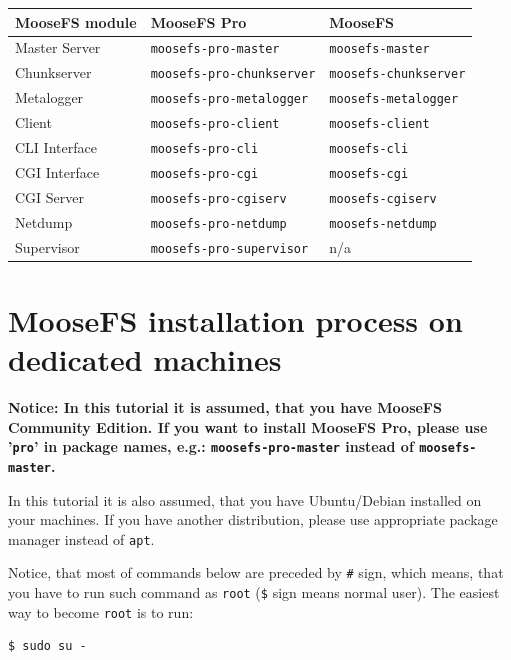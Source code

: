 \documentclass[a4paper,11pt,english]{report}
\def\code#1{\texttt{#1}}
\begin{document}
			\bigskip

			\begin{tabular}{l | l | l}
				\textbf{MooseFS module}	&	\textbf{MooseFS Pro}				& {\textbf{MooseFS}}			\\ \hline
				Master Server			&	\code{moosefs-pro-master}			& \code{moosefs-master}		\\ \hline
				Chunkserver				&	\code{moosefs-pro-chunkserver}	& \code{moosefs-chunkserver}	\\ \hline
				Metalogger				&	\code{moosefs-pro-metalogger}		& \code{moosefs-metalogger}	\\ \hline
				Client					&	\code{moosefs-pro-client}			& \code{moosefs-client}		\\ \hline
				CLI Interface			&	\code{moosefs-pro-cli}			& \code{moosefs-cli}			\\ \hline
				CGI Interface			&	\code{moosefs-pro-cgi}			& \code{moosefs-cgi}			\\ \hline
				CGI Server				&	\code{moosefs-pro-cgiserv}		& \code{moosefs-cgiserv}		\\ \hline
				Netdump					&	\code{moosefs-pro-netdump}		& \code{moosefs-netdump}		\\ \hline
				Supervisor				&	\code{moosefs-pro-supervisor}		& n/a
			\end{tabular}
			
			
	\chapter{MooseFS installation process on dedicated machines}
		\textbf{Notice: In this tutorial it is assumed, that you have MooseFS Community Edition. If you want to install MooseFS Pro, please use '\code{pro}' in package names, e.g.: \code{moosefs-pro-master} instead of \code{moosefs-master}.}
		
		\bigskip
		
		In this tutorial it is also assumed, that you have Ubuntu/Debian installed on your machines. If you have another distribution, please use appropriate package manager instead of \code{apt}.
		
		Notice, that most of commands below are preceded by \code{\#} sign, which means, that you have to run such command as \code{root} (\code{\$} sign means normal user). The easiest way to become \code{root} is to run:
		
		\begin{lstlisting}[caption={Becoming \code{root}}]
	$ sudo su -
		\end{lstlisting}
		
\end{document}

